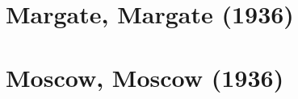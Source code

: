 \documentclass[11pt]{article}
\begin{document}
\clearpage

\section{Margate, Margate (1936)}


\clearpage



\clearpage



\clearpage

\section{Moscow, Moscow (1936)}


\clearpage



\clearpage



\clearpage



\clearpage



\clearpage



\clearpage



\clearpage



\clearpage



\clearpage



\clearpage



\clearpage



\clearpage



\clearpage



\clearpage



\clearpage


\end{document}
